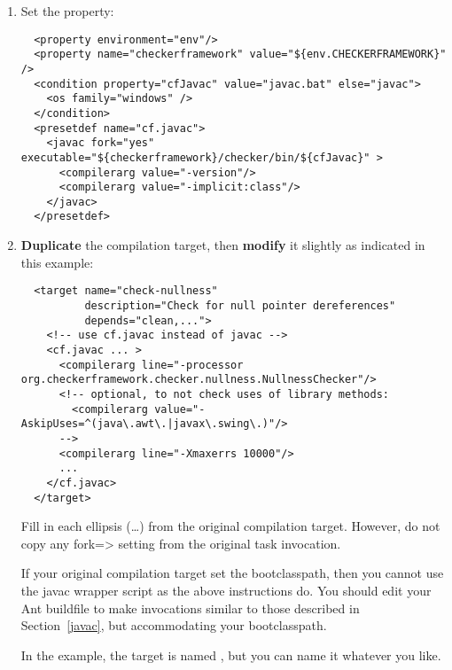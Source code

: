\begin{enumerate}
\item
Set the  property:

\begin{smaller}
\begin{Verbatim}
  <property environment="env"/>
  <property name="checkerframework" value="${env.CHECKERFRAMEWORK}" />
  <condition property="cfJavac" value="javac.bat" else="javac">
    <os family="windows" />
  </condition>
  <presetdef name="cf.javac">
    <javac fork="yes" executable="${checkerframework}/checker/bin/${cfJavac}" >
      <compilerarg value="-version"/>
      <compilerarg value="-implicit:class"/>
    </javac>
  </presetdef>
\end{Verbatim}
\end{smaller}

\item \textbf{Duplicate} the compilation target, then \textbf{modify} it slightly as
indicated in this example:

\begin{smaller}
\begin{Verbatim}
  <target name="check-nullness"
          description="Check for null pointer dereferences"
          depends="clean,...">
    <!-- use cf.javac instead of javac -->
    <cf.javac ... >
      <compilerarg line="-processor org.checkerframework.checker.nullness.NullnessChecker"/>
      <!-- optional, to not check uses of library methods:
        <compilerarg value="-AskipUses=^(java\.awt\.|javax\.swing\.)"/>
      -->
      <compilerarg line="-Xmaxerrs 10000"/>
      ...
    </cf.javac>
  </target>
\end{Verbatim}
\end{smaller}

Fill in each ellipsis (\ldots) from the original compilation target.
However, do not copy any \<fork=> setting from the original 
task invocation.

If your original compilation target set the bootclasspath, then you cannot
use the javac wrapper script as the above instructions do.  You should edit
your Ant buildfile to make invocations similar to those described in
Section~\ref{javac}, but accommodating your bootclasspath.

In the example, the target is named , but you can
name it whatever you like.
\end{enumerate}

